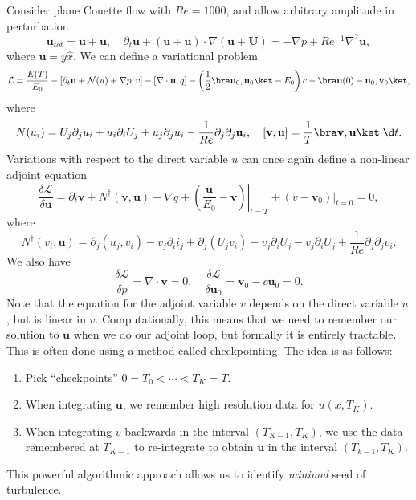 \documentclass[a4paper]{article}
\begin{document}
Consider plane Couette flow with $Re = 1000$, and allow arbitrary amplitude in perturbation
\[
  \mathbf{u}_{tot} = \mathbf{u} + \mathbf{u},\quad \partial_t \mathbf{u} + (\mathbf{u} + \mathbf{u}) \cdot \nabla (\mathbf{u} + \mathbf{U}) = - \nabla p + Re^{-1} \nabla^2 \mathbf{u},
\]
where $\mathbf{u} = y\hat{x}$. We can define a variational problem
\[
  \mathcal{L} = \frac{E(T)}{E_0} - [\partial_t \mathbf{u} + \mathcal{N}(u) + \nabla p, v] - [\nabla \cdot \mathbf{u}, q] - \left(\frac{1}{2} \bra \mathbf{u}_0, \mathbf{u}_0\ket - E_0\right) c - \bra \mathbf{u}(0) - \mathbf{u}_0, \mathbf{v}_0\ket,
\]
where
\[
  N(u_i) = U_j \partial_j u_i + u _i \partial_i U_j + u_j \partial_j u_i - \frac{1}{Re} \partial_j \partial_j \mathbf{u}_i,\quad [\mathbf{v}, \mathbf{u}] = \frac{1}{T} \bra \mathbf{v}, \mathbf{u}\ket\;\d t.
\]
Variations with respect to the direct variable $u$ can once again define a non-linear adjoint equation
\[
  \frac{\delta \mathcal{L}}{\delta \mathbf{u}} = \partial_t \mathbf{v} + N^\dagger (\mathbf{v}, \mathbf{u}) + \nabla q + \left.\left(\frac{\mathbf{u}}{E_0} - \mathbf{v}\right)\right|_{t = T} + (v - \mathbf{v}_0)|_{t = 0} = 0,
\]
where
\[
  N^\dagger (v_i, \mathbf{u}) = \partial_j (u_j, v_i) - v_j \partial_i i_j + \partial_j (U_j v_i) - v_j \partial_i U_j - v_j \partial_i U_j + \frac{1}{Re} \partial_j \partial_j v_i.
\]
We also have
\[
  \frac{\delta \mathcal{L}}{\delta p} = \nabla \cdot \mathbf{v} = 0,\quad \frac{\delta \mathcal{L}}{\delta \mathbf{u}_0} = \mathbf{v}_0 - c \mathbf{u}_0 = 0.
\]
Note that the equation for the adjoint variable $v$ depends on the direct variable $u$, but is linear in $v$. Computationally, this means that we need to remember our solution to $\mathbf{u}$ when we do our adjoint loop, but formally it is entirely tractable. This is often done using a method called checkpointing. The idea is as follows:
\begin{enumerate}
  \item Pick ``checkpoints'' $0 = T_0 < \cdots < T_K = T$.
  \item When integrating $\mathbf{u}$, we remember high resolution data for $u(x, T_K)$.
  \item When integrating $v$ backwards in the interval $(T_{K - 1}, T_K)$, we use the data remembered at $T_{K - 1}$ to re-integrate to obtain $\mathbf{u}$ in the interval $(T_{k - 1}, T_K)$.
\end{enumerate}
This powerful algorithmic approach allows us to identify \emph{minimal} seed of turbulence.


\printindex
\end{document}
